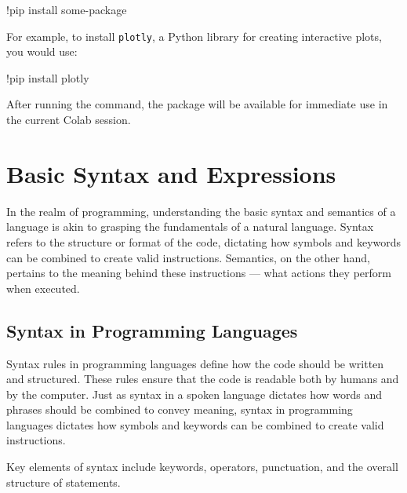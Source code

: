 \documentclass[
  letterpaper,
  DIV=11,
  numbers=noendperiod]{scrreprt}
\newenvironment{Shaded}{\begin{snugshade}}{\end{snugshade}}
\newcommand{\NormalTok}[1]{\textcolor[rgb]{0.00,0.23,0.31}{#1}}
\newcommand{\OperatorTok}[1]{\textcolor[rgb]{0.37,0.37,0.37}{#1}}
\begin{document}
\begin{Shaded}
\begin{Highlighting}[]
\OperatorTok{!}\NormalTok{pip install some}\OperatorTok{{-}}\NormalTok{package}
\end{Highlighting}
\end{Shaded}

For example, to install \texttt{plotly}, a Python library for creating
interactive plots, you would use:

\begin{Shaded}
\begin{Highlighting}[]
\OperatorTok{!}\NormalTok{pip install plotly}
\end{Highlighting}
\end{Shaded}

After running the command, the package will be available for immediate
use in the current Colab session.


\hypertarget{basic-syntax-and-expressions}{%
\chapter{Basic Syntax and
Expressions}\label{basic-syntax-and-expressions}}

In the realm of programming, understanding the basic syntax and
semantics of a language is akin to grasping the fundamentals of a
natural language. Syntax refers to the structure or format of the code,
dictating how symbols and keywords can be combined to create valid
instructions. Semantics, on the other hand, pertains to the meaning
behind these instructions --- what actions they perform when executed.

\hypertarget{syntax-in-programming-languages}{%
\section{Syntax in Programming
Languages}\label{syntax-in-programming-languages}}

Syntax rules in programming languages define how the code should be
written and structured. These rules ensure that the code is readable
both by humans and by the computer. Just as syntax in a spoken language
dictates how words and phrases should be combined to convey meaning,
syntax in programming languages dictates how symbols and keywords can be
combined to create valid instructions.

Key elements of syntax include keywords, operators, punctuation, and the
overall structure of statements.
\end{document}
